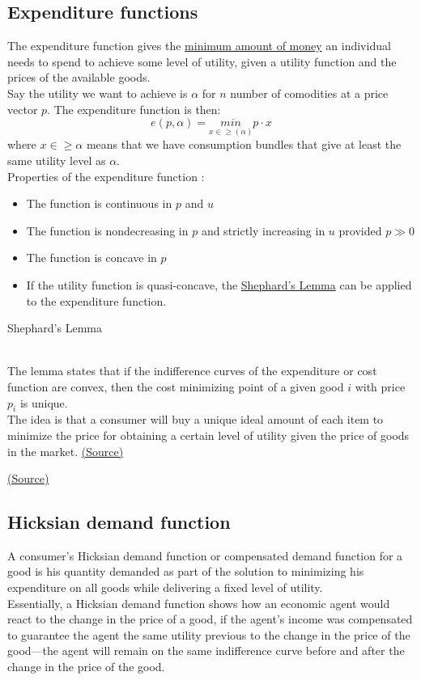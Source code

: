\documentclass[a4paper, 12pt, reqno]{article}
\begin{document}
\subsection{Expenditure functions}
The expenditure function gives the \underline{minimum amount of money} an individual needs to spend to achieve some level of utility, given a utility function and the prices of the available goods. \\
Say the utility we want to achieve is $\alpha$ for $n$ number of comodities at a price vector $p$. The expenditure function is then:
$$ e(p, \alpha) = \underset{x \in \geq (\alpha)}{min} p \cdot x$$
where $ x \in \geq \alpha$ means that we have consumption bundles that give at least the same utility level as $\alpha$. \\
Properties of the expenditure function :
\begin{itemize}
    \item The function is continuous in $p$ and $u$ 
    \item The function is nondecreasing in $p$ and strictly increasing in $u$ provided $p \gg 0$ 
    \item The function is concave in $p$
    \item If the utility function is quasi-concave, the \hyperlink{thesentence}{Shephard's Lemma} can be applied to the expenditure function. 
\end{itemize}

\begin{tcolorbox}
    \hypertarget{thesentence}{Shephard's Lemma} \\
    The lemma states that if the indifference curves of the expenditure or cost function are convex, then the cost minimizing point of a given good $i$ with price $p_i$ is unique. \\ The idea is that a consumer will 
    buy a unique ideal amount of each item to minimize the price for obtaining a certain level of utility given the price of goods in the market. \href{https://en.wikipedia.org/wiki/Shephard%27s_lemma}{(Source)}
\end{tcolorbox}
    
\href{https://en.wikipedia.org/wiki/Expenditure_function}{(Source)}

\subsection{Hicksian demand function}
A consumer's Hicksian demand function or compensated demand function for a good is his quantity demanded as part of the solution to minimizing his expenditure on all goods while delivering a fixed level of utility. \\ Essentially, a Hicksian demand function shows how an 
economic agent would react to the change in the 
price of a good, if the agent's income was compensated to guarantee the agent the same utility previous to the change in the price of the good—the agent will remain on the same indifference curve before and after the change in the price of the good.
\end{document}
